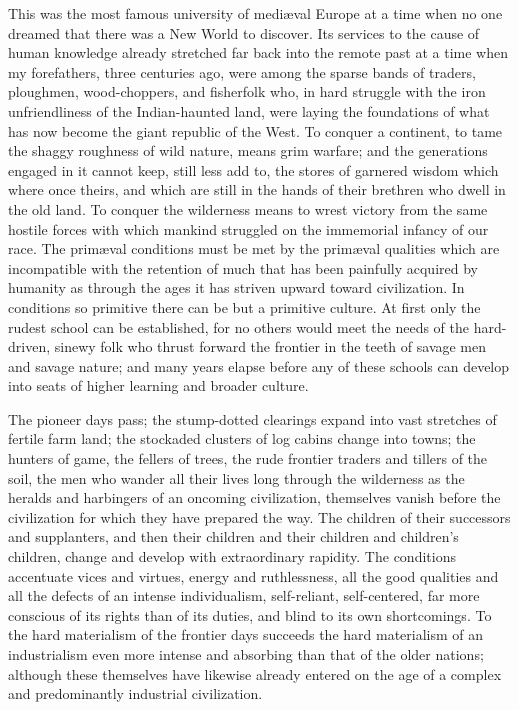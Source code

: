 \documentclass{scrbook}
\begin{document}
This was the most famous university of mediæval Europe at a time when no one dreamed
that there was a New World to discover. Its services to the cause of human knowledge already stretched far back into the remote past at a time when my forefathers, three centuries
ago, were among the sparse bands of traders, ploughmen, wood-choppers, and fisherfolk
who, in hard struggle with the iron unfriendliness of the Indian-haunted land, were laying
the foundations of what has now become the giant republic of the West. To conquer a continent, to tame the shaggy roughness of wild nature, means grim warfare; and the generations
engaged in it cannot keep, still less add to, the stores of garnered wisdom which where
once theirs, and which are still in the hands of their brethren who dwell in the old land.
To conquer the wilderness means to wrest victory from the same hostile forces with which
mankind struggled on the immemorial infancy of our race. The primæval conditions must
be met by the primæval qualities which are incompatible with the retention of much that
has been painfully acquired by humanity as through the ages it has striven upward toward
civilization. In conditions so primitive there can be but a primitive culture. At first only
the rudest school can be established, for no others would meet the needs of the hard-driven,
sinewy folk who thrust forward the frontier in the teeth of savage men and savage nature;
and many years elapse before any of these schools can develop into seats of higher learning
and broader culture.

The pioneer days pass; the stump-dotted clearings expand into vast stretches of fertile
farm land; the stockaded clusters of log cabins change into towns; the hunters of game,
the fellers of trees, the rude frontier traders and tillers of the soil, the men who wander
all their lives long through the wilderness as the heralds and harbingers of an oncoming
civilization, themselves vanish before the civilization for which they have prepared the way.
The children of their successors and supplanters, and then their children and their children
and children’s children, change and develop with extraordinary rapidity. The conditions
accentuate vices and virtues, energy and ruthlessness, all the good qualities and all the
defects of an intense individualism, self-reliant, self-centered, far more conscious of its
rights than of its duties, and blind to its own shortcomings. To the hard materialism of
the frontier days succeeds the hard materialism of an industrialism even more intense and
absorbing than that of the older nations; although these themselves have likewise already
entered on the age of a complex and predominantly industrial civilization.
\end{document}
